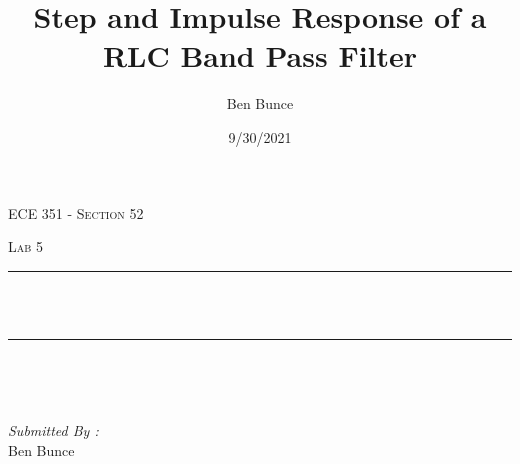 \documentclass[12pt]{report}
\title{Step and Impulse Response of a RLC Band Pass Filter}
\author{Ben Bunce}
\date{9/30/2021}
\makeatletter
\let\thetitle\@title
\makeatother
\begin{document}

\begin{titlepage}
	\centering
    \vspace*{0.5 cm}
\begin{center}    \textsc{\Large   ECE 351 - Section 52}\\[2.0 cm]	\end{center}%
	\textsc{\Large Lab 5  }\\[0.5 cm]				%
	\rule{\linewidth}{0.2 mm} \\[0.4 cm]
	{ \huge \bfseries \thetitle}\\
	\rule{\linewidth}{0.2 mm} \\[1.5 cm]
	
	\begin{minipage}{0.4\textwidth}
		\begin{flushleft} \large
			\end{flushleft}
			\end{minipage}~
			\begin{minipage}{0.4\textwidth}
            
			\begin{flushright} \large
			\emph{Submitted By :} \\
			Ben Bunce  
		\end{flushright}
           
	\end{minipage}\\[2 cm]
	
    
    
    
    
	
\end{titlepage}


\tableofcontents
\pagebreak

\renewcommand{\thesection}{\arabic{section}}
\end{document}
